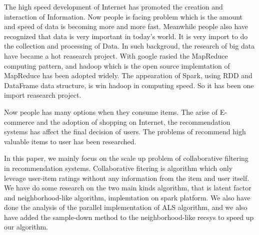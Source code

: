 %
%
\begin{enabstract}
    The high speed development of Internet has promoted the creation and interaction of Information. Now people is facing problem which is the amount and speed of data is becoming more and more fast. Meanwhile people also have recognized that data is very important in today's world. It is very import to do the collection and processing of Data. In such backgroud, the research of big data have became a hot reasearch project. With google rasied the MapReduce computing pattern, and hadoop which is the open source implemtation of MapReduce has been adopted widely. The appearation of Spark, using RDD and DataFrame data structure, is win hadoop in computing speed. So it has been one import reasearch project.
    
    Now people has many options when they consume items. The arise of E-commerce and the adoption of shopping on Internet, the recommendation systems has affect the final decision of users. The problems of recommend high valuable items to user has been researched.
    
    In this paper, we mainly focus on the scale up problem of collaborative filtering in recommendation systems. Collaborative fitering is algorithm which only leveage user-item ratings without any information from the item and user itself. We have do some research on the two main kinds algorithm, that is latent factor and neighborhood-like algorithm, implemtation on spark platform. We also have done the analysis of the parallel implementation of ALS algorithm, and we also have added the sample-down method to the neighborhood-like recsys to speed up our algorithm.
\end{enabstract}

